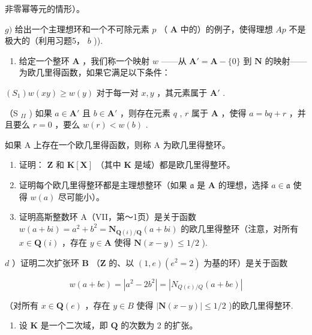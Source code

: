 非零幂等元的情形）。

\(g)\) 给出一个主理想环和一个不可除元素 \(p\) （ \(\mathbf{A}\) 中的）的例子，使得理想 \(Ap\) 不是极大的（利用习题5， \(b\) )).

\begin{enumerate}
\def\labelenumi{\arabic{enumi})}
\setcounter{enumi}{6}
\tightlist
\item
  给定一个整环 \(\mathbf{A}\) ，我们称一个映射 \(w\) ——从 \(\mathbf{A}' = \mathbf{A} - \{0\}\) 到 \(\mathbf{N}\) 的映射——为欧几里得函数，如果它满足以下条件：
\end{enumerate}

\((S_{1}) w(xy) \geqslant w(y)\) 对于每一对 \(x, y\) ，其元素属于 \(\mathbf{A}'\) .

（S \(_{II}\) ) 如果 \(a \in \mathbf{A}'\) 且 \(b \in \mathbf{A}'\) ，则存在元素 \(q\) , \(r\) 属于 \(\mathbf{A}\) ，使得 \(a = bq + r\) ，并且要么 \(r = 0\) ，要么 \(w(r) < w(b)\) .

如果 A 上存在一个欧几里得函数，则称 A 为欧几里得整环。

\begin{enumerate}
\def\labelenumi{\alph{enumi})}
\item
  证明： \(\mathbf{Z}\) 和 \(\mathbf{K}[\mathbf{X}]\) （其中 \(\mathbf{K}\) 是域）都是欧几里得整环。
\item
  证明每个欧几里得整环都是主理想整环（如果 \(\mathfrak{a}\) 是 \(\mathbf{A}\) 的理想，选择 \(a \in \mathfrak{a}\) 使得 \(w(a)\) 尽可能小）。
\item
  证明高斯整数环 A（VII，第～1页）是关于函数 \(w(a + bi) = a^2 + b^2 = \mathbf{N}_{\mathbf{Q}(i) / \mathbf{Q}}(a + bi)\) 的欧几里得整环（注意，对所有 \(x \in \mathbf{Q}(i)\) ，存在 \(y \in \mathbf{A}\) 使得 \(\mathbf{N}(x - y) \leqslant 1/2\) ).
\end{enumerate}

\(d\) ）证明二次扩张环 \(\mathbf{B}\) （\(\mathbf{Z}\) 的、以 \((1,e)(e^2 = 2)\) 为基的环）是关于函数

\[
w (a + b e) = \left| a ^ {2} - 2 b ^ {2} \right| = \left| N _ {Q (e) / Q} (a + b e) \right|
\]

（对所有 \(x \in \mathbf{Q}(e)\) ，存在 \(y \in B\) 使得 \(|\mathbf{N}(x - y)| \leqslant 1/2\) )的欧几里得整环.

\begin{enumerate}
\def\labelenumi{\arabic{enumi})}
\setcounter{enumi}{7}
\tightlist
\item
  设 \(\mathbf{K}\) 是一个二次域，即 \(\mathbf{Q}\) 的次数为 2 的扩张。
\end{enumerate}

